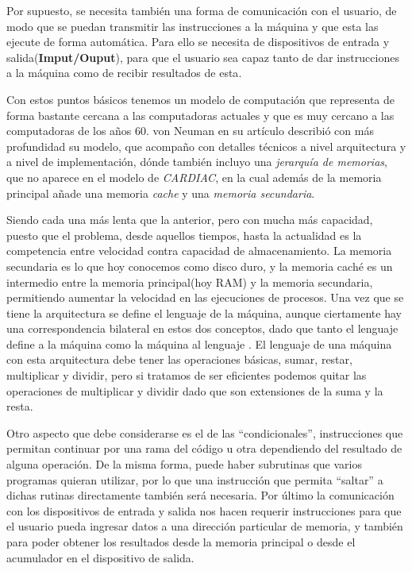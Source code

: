 \documentclass[letterpaper,12pt,oneside]{book}
\begin{document}
		Por supuesto, se necesita también una forma de comunicación con el usuario, de modo que se puedan transmitir las instrucciones a la máquina
		y que esta las ejecute de forma automática. Para ello se necesita de dispositivos de entrada y salida(\textbf{Imput/Ouput}), para que
		el usuario sea capaz tanto de dar instrucciones a la máquina como de recibir resultados de esta\cite{von_neumann_papers_1987}.
		
		Con estos puntos básicos tenemos un modelo de computación que representa de forma bastante cercana a las computadoras actuales y que es muy cercano
		a las computadoras de los años 60. von Neuman en su artículo describió con más profundidad su modelo, que acompaño con detalles técnicos
		a nivel arquitectura y a nivel de implementación, dónde también incluyo una 
		\textit{jerarquía de memorias}, que no aparece en el modelo de \textit{CARDIAC}, en la cual además de la memoria principal añade una memoria 
		\textit{cache} y una \textit{memoria secundaria}\cite{von_neumann_papers_1987}.
  
	    Siendo cada una más lenta que la anterior, pero con mucha más capacidad, puesto que el problema, desde aquellos tiempos, hasta la actualidad
		es la competencia entre velocidad contra capacidad de almacenamiento. La memoria secundaria es lo que hoy conocemos como disco 
		duro, y la memoria caché es un intermedio entre la memoria principal(hoy RAM) y la memoria secundaria, permitiendo aumentar la velocidad en las 
		ejecuciones	de procesos\cite{von_neumann_papers_1987}.
		Una vez que se tiene la arquitectura se define el lenguaje de la máquina, aunque ciertamente hay una correspondencia bilateral en estos
		dos conceptos, dado que tanto el lenguaje define a la máquina como la máquina al lenguaje \cite{tanenbaum_structured_2013}. El
		lenguaje de una máquina con esta arquitectura debe tener las operaciones básicas, sumar, restar, multiplicar y dividir, pero
		si tratamos de ser eficientes podemos quitar las operaciones de multiplicar y dividir dado que son extensiones de la suma y la resta.
  
        Otro
		aspecto que debe considerarse es el de las ``condicionales'', instrucciones que permitan continuar por una rama del código u otra
		dependiendo del resultado de alguna operación. De la misma forma, puede haber subrutinas que varios programas quieran utilizar, por lo
		que una instrucción que permita ``saltar'' a dichas rutinas directamente también será necesaria. Por último la comunicación con los dispositivos
		de entrada y salida nos hacen requerir instrucciones para que el usuario pueda ingresar datos a una dirección particular de memoria, y también para
		poder obtener los resultados desde la memoria principal o desde el acumulador en el dispositivo de salida\cite{von_neumann_papers_1987}.
		
\end{document}
